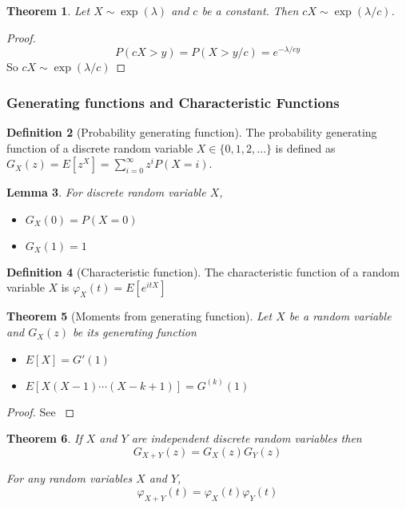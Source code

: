 \documentclass{article}
\theoremstyle{plain}
\newtheorem{theorem}{Theorem}[section]
\newtheorem{lemma}[theorem]{Lemma}
\theoremstyle{definition}
\newtheorem{defn}[theorem]{Definition}
\theoremstyle{remark}
\begin{document}
\begin{theorem} \label{thm:exp_scaling}
Let $X \sim \exp(\lambda)$ and $c$ be a constant.
Then $cX \sim \exp(\lambda/c)$.
\end{theorem}

\begin{proof}
$$
    P(cX > y) = P(X > y/c) = e^{-\lambda/c y}
$$
So $cX \sim \exp(\lambda/c)$ 
\end{proof}

\subsubsection{Generating functions and Characteristic Functions}

\begin{defn}[Probability generating function]
The probability generating function of a discrete random variable $X \in \{0,1,2, \ldots\}$ is defined as $G_X(z) = E[z^X] = \sum_{i = 0}^\infty z^i P(X = i)$.
\end{defn}

\begin{lemma}
For discrete random variable $X$,
\begin{itemize}
    \item $G_X(0) = P(X = 0)$
    \item $G_X(1) = 1$
\end{itemize}
\end{lemma}

\begin{defn}[Characteristic function]
The characteristic function of a random variable $X$ is $\varphi_X(t) = E[e^{itX}]$
\end{defn}

\begin{theorem}[Moments from generating function] \cite{grimmett2001}
Let $X$ be a random variable and $G_X(z)$ be its generating function
\begin{itemize}
    \item $E[X] = G'(1)$
    \item $E[X (X - 1) \cdots (X - k + 1)] = G^{(k)}(1)$
\end{itemize}
\end{theorem}

\begin{proof}
See \cite{grimmett2001}
\end{proof}

\begin{theorem}
If $X$ and $Y$ are independent discrete random variables then
$$
G_{X + Y}(z) = G_X(z) G_Y(z)
$$

For any random variables $X$ and $Y$, 
$$
\varphi_{X + Y}(t) = \varphi_X(t) \varphi_Y(t)
$$
\end{theorem}
\end{document}
